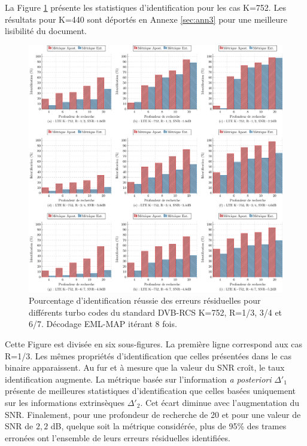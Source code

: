 La Figure \ref{fig:dvb752} présente les statistiques d'identification pour les cas K=752. Les résultats pour K=440 sont 
déportés en Annexe \ref{sec:ann3} pour une meilleure lisibilité du document.
\begin{figure}[!h]
	\centering
	\includegraphics[width=1\textwidth]{main/ch3_fig/id2/dvb/tikz/752.pdf}
	\caption{Pourcentage d'identification réussie des erreurs résiduelles pour différents turbo codes du standard DVB-RCS K=752, R=1/3, 3/4 et 6/7.
	Décodage EML-MAP itérant 8 fois. \label{fig:dvb752}}
\end{figure}
Cette Figure est divisée en six sous-figures. La première ligne correspond aux cas R=1/3. Les mêmes propriétés 
d'identification que celles présentées dans le cas binaire apparaissent. Au fur et à mesure que la valeur du SNR croît, le 
taux identification augmente. La métrique basée sur l'information \textit{a posteriori} $\Delta'_1$ présente de meilleures statistiques
d'identification que celles basées uniquement sur les informations extrinsèques $\Delta'_2$. Cet écart diminue avec l'augmentation du SNR.
Finalement, pour une profondeur de recherche de 20 et pour une valeur de SNR de $2,2$ dB, quelque soit la métrique considérée, 
plus de 95\% des trames erronées ont l'ensemble de leurs erreurs résiduelles identifiées.

